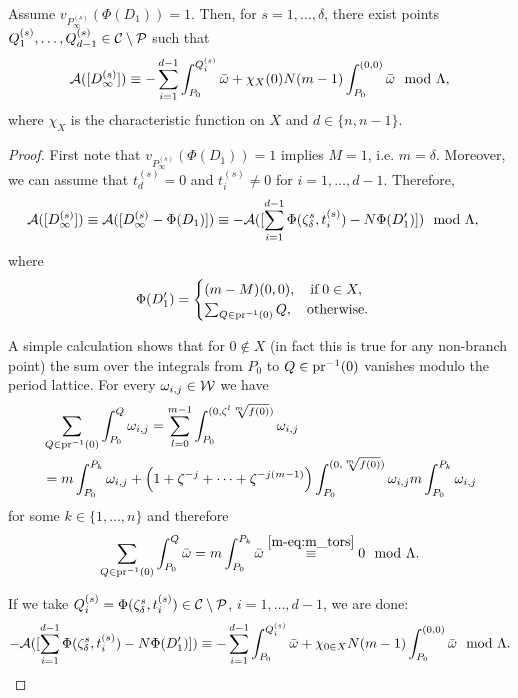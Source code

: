 \documentclass[main.tex]{subfiles}
\begin{document}
  \begin{thm}\label{thm:ajm_inf_ord1}
    Assume $v_{P_{\infty}^{(s)}}(\Phi(D_1)) = 1$. Then, for $s = 1,\dots,\delta$, there exist points $Q_1^{(s)},\dots,Q_{d-1}^{(s)} \in \mathcal{C} \setminus \mathcal{P}$ such that
    \begin{equation}\label{eq:ajm_int_ord0}
       \mathcal{A}( [D_{\infty}^{(s)}] ) \equiv -\sum_{i = 1}^{d-1} \int_{P_0}^{Q_i^{(s)}} \bar{\omega} + \chi_{X}(0) N(m-1) \int_{P_0}^{(0,0)}\bar{\omega} \mod \Lambda,
    \end{equation}
    where $\chi_{X}$ is the characteristic function on $X$ and $d \in \{n,n-1\}$.
  \end{thm}
  \begin{proof}
    First note that $v_{P_{\infty}^{(s)}}(\Phi(D_1)) = 1$ implies $M = 1$, i.e. $m = \delta$. 
    Moreover, we can assume that $t_d^{(s)} = 0$ and $t_i^{(s)} \ne 0$ for $i=1,\dots,d-1$.
    Therefore,
    \begin{align}
      \mathcal{A}( [D_{\infty}^{(s)}] )  & \equiv  \mathcal{A}([D_{\infty}^{(s)} - \Phi(D_1)])  
      \equiv  -\mathcal{A}( [\sum_{i = 1}^{d-1} \Phi(\zeta_{\delta}^s,t_i^{(s)}) - N \Phi(D_1') ] )
       \mod \Lambda,
    \end{align}
    where 
    \begin{equation}
     \Phi(D_1') = \begin{cases}
	     (m-M) (0,0), \quad \text{if} \; 0 \in X, \\
            \sum_{Q \in \operatorname{pr}^{-1}(0)} Q, \quad \text{otherwise.}
            \end{cases}
    \end{equation}

    A simple calculation shows that for $0 \not\in X$ (in fact this is true for any non-branch point) the sum over the integrals from $P_0$ to $Q \in \operatorname{pr}^{-1}(0)$ vanishes modulo the period lattice. 
    For every $\omega_{i,j} \in \mathcal{W}$ we have
    \begin{align}
      & \sum_{Q \in \operatorname{pr}^{-1}(0)} \int_{P_0}^Q \omega_{i,j} =  \sum_{l=0}^{m-1} \int_{P_0}^{(0,\zeta^l \sqrt[m]{f(0)})} \omega_{i,j} \\
    & = m \int_{P_0}^{P_k} \omega_{i,j} + \left(1 + \zeta^{-j} + \dots + \zeta^{-j(m-1)}\right) \int_{P_0}^{(0,\sqrt[m]{f(0)})} \omega_{i,j}
     m \int_{P_0}^{P_k} \omega_{i,j}
    \end{align}
    for some $k \in \{1,\dots,n\}$ and therefore
    \begin{equation}
       \sum_{Q \in \operatorname{pr}^{-1}(0)} \int_{P_0}^Q \bar{\omega} =  m \int_{P_0}^{P_k} \bar{\omega} \overset{\eqref{m-eq:m_tors}}{\equiv} 0 \mod \Lambda.
    \end{equation}
    
    If we take $Q_i^{(s)} = \Phi(\zeta_{\delta}^s,t_i^{(s)}) \in \mathcal{C} \setminus \mathcal{P}$, $i = 1,\dots,d-1$, we are done:
    \begin{align}
    -\mathcal{A}( [\sum_{i = 1}^{d-1} \Phi(\zeta_{\delta}^s,t_i^{(s)}) - N \Phi(D_1') ] ) \equiv -\sum_{i = 1}^{d-1} \int_{P_0}^{Q_i^{(s)}} \bar{\omega} + \chi_{0 \in X} N(m-1) \int_{P_0}^{(0,0)} \bar{\omega} \mod \Lambda.
    \end{align}
     \end{proof}
\end{document}
